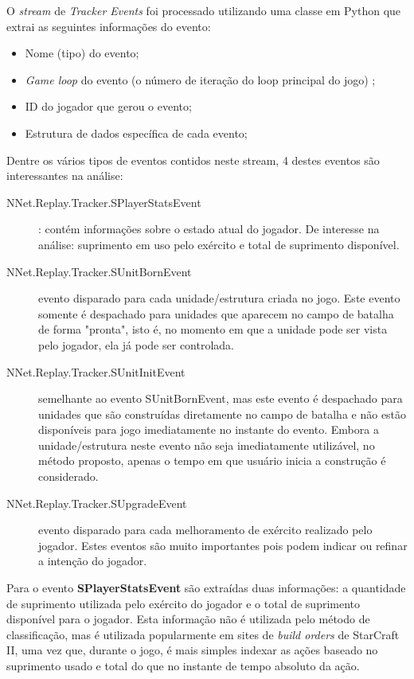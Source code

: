 O \textit{stream} de \textit{Tracker Events} foi processado utilizando uma classe em Python que extrai as seguintes informações do evento:

\begin{itemize}
	\item Nome (tipo) do evento;
	\item \textit{Game loop} do evento (o número de iteração do loop principal do jogo) ;
	\item ID do jogador que gerou o evento;
	\item Estrutura de dados específica de cada evento;
\end{itemize}

Dentre os vários tipos de eventos contidos neste stream, 4 destes eventos são interessantes na análise:

\begin{description}
	\item[NNet.Replay.Tracker.SPlayerStatsEvent]: contém informações sobre o estado atual do jogador. De interesse na análise: suprimento em uso pelo exército e total de suprimento disponível.
	\item[NNet.Replay.Tracker.SUnitBornEvent] evento disparado para cada unidade/estrutura criada no jogo. Este evento somente é despachado para unidades que aparecem no campo de batalha de forma "pronta", isto é, no momento em que a unidade pode ser vista pelo jogador, ela já pode ser controlada.
	\item[NNet.Replay.Tracker.SUnitInitEvent] semelhante ao evento SUnitBornEvent, mas este evento é despachado para unidades que são construídas diretamente no campo de batalha e não estão disponíveis para jogo imediatamente no instante do evento. Embora a unidade/estrutura neste evento não seja imediatamente utilizável, no método proposto, apenas o tempo em que usuário inicia a construção é considerado.
	\item[NNet.Replay.Tracker.SUpgradeEvent] evento disparado para cada melhoramento de exército realizado pelo jogador. Estes eventos são muito importantes pois podem indicar ou refinar a intenção do jogador.
\end{description}

Para o evento \textbf{SPlayerStatsEvent} são extraídas duas informações: a quantidade de suprimento utilizada pelo exército do jogador e o total de suprimento disponível para o jogador. Esta informação não é utilizada pelo método de classificação, mas é utilizada popularmente em sites de \textit{build orders} de StarCraft II, uma vez que, durante o jogo, é mais simples indexar as ações baseado no suprimento usado e total do que no instante de tempo absoluto da ação.

